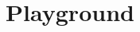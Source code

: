 \documentclass{article}
\title{Playground}
\begin{document}
\maketitle
\tableofcontents

\textcite{einstein}





\printbibliography
\end{document}
